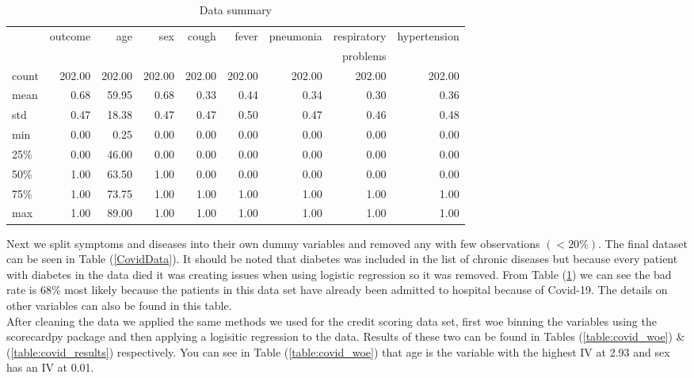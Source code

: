 \begin{table}[H]
	\begin{tabular}{lrrrrrrrr}
	\toprule
	{} &  outcome &     age &     sex &   cough &   fever &  pneumonia &  respiratory &  hypertension \\
	{} & {} & {} & {} & {} & {} & {} & problems & {} \\
	\midrule
	count &   202.00 &  202.00 &  202.00 &  202.00 &  202.00 &     202.00 &                202.00 &        202.00 \\
	mean  &     0.68 &   59.95 &    0.68 &    0.33 &    0.44 &       0.34 &                  0.30 &          0.36 \\
	std   &     0.47 &   18.38 &    0.47 &    0.47 &    0.50 &       0.47 &                  0.46 &          0.48 \\
	min   &     0.00 &    0.25 &    0.00 &    0.00 &    0.00 &       0.00 &                  0.00 &          0.00 \\
	25\%   &     0.00 &   46.00 &    0.00 &    0.00 &    0.00 &       0.00 &                  0.00 &          0.00 \\
	50\%   &     1.00 &   63.50 &    1.00 &    0.00 &    0.00 &       0.00 &                  0.00 &          0.00 \\
	75\%   &     1.00 &   73.75 &    1.00 &    1.00 &    1.00 &       1.00 &                  1.00 &          1.00 \\
	max   &     1.00 &   89.00 &    1.00 &    1.00 &    1.00 &       1.00 &                  1.00 &          1.00 \\
	\bottomrule
	\end{tabular}
	\caption{Data summary \label{table:covid_data_sum}}
\end{table}

Next we split symptoms and diseases into their own dummy variables and removed any with few observations $( < 20\% )$. The final dataset can be seen in Table (\ref{CovidData}). It should be noted that diabetes was included in the list of chronic diseases but because every patient with diabetes in the data died it was creating issues when using logistic regression so it was removed. From Table (\ref{table:covid_data_sum}) we can see the bad rate is 68\% most likely because the patients in this data set have already been admitted to hospital because of Covid-19. The details on other variables can also be found in this table.\\

After cleaning the data we applied the same methods we used for the credit scoring data set, first woe binning the variables using the scorecardpy package and then applying a logisitic regression to the data. Results of these two can be found in Tables (\ref{table:covid_woe}) \& (\ref{table:covid_results}) respectively. You can see in Table (\ref{table:covid_woe}) that age is the variable with the highest IV at 2.93 and sex has an IV at 0.01. \\

